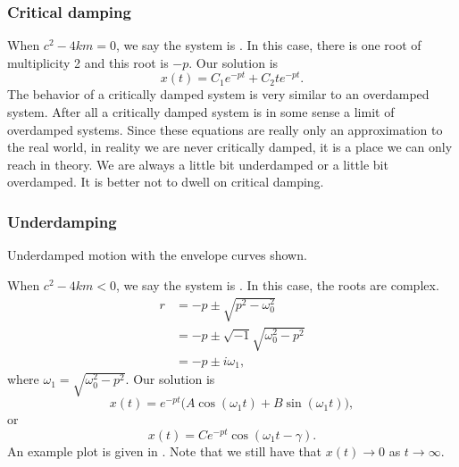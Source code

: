 \subsubsection{Critical damping}

When
$c^2 - 4km = 0$, we say the system is \emph{}.  In this case,
there is one root of multiplicity 2 and this root is $-p$.  Our solution is
\begin{equation*}
x(t) = C_1 e^{-pt} + C_2 t e^{-pt} .
\end{equation*}
The behavior of a critically damped system is very similar to an overdamped
system.  After all a critically damped system is in some sense a limit
of overdamped systems.  Since these equations are really only an
approximation to the real world, in reality we are never critically
damped, it is a place we can only reach in theory.  We are always
a little bit underdamped or a little bit overdamped.  It is better not to
dwell on critical damping.

\subsubsection{Underdamping}

\begin{mywrapfig}{3.25in}
\capstart
{}
\caption{Underdamped motion with the envelope curves shown.\label{mv:underdampedfig}}
\end{mywrapfig}
%
%

When
$c^2 - 4km < 0$, we say the system is \emph{}.  In this case,
the roots are complex.
\begin{equation*}
\begin{split}
r & =
-p \pm \sqrt{p^2 - \omega_0^2} \\
& = 
-p \pm \sqrt{-1}\sqrt{\omega_0^2 - p^2} \\
& = 
-p \pm i \omega_1 ,
\end{split}
\end{equation*}
where $\omega_1 =\sqrt{\omega_0^2 - p^2}$.  Our solution is
\begin{equation*}
x(t) = e^{-pt} \bigl( A \cos (\omega_1 t) + B \sin (\omega_1 t) \bigr) ,
\end{equation*}
or
\begin{equation*}
x(t) = C e^{-pt} \cos ( \omega_1 t - \gamma ) .
\end{equation*}
An example plot is given in .  Note that we
still have that $x(t) \to 0$ as $t \to \infty$.

